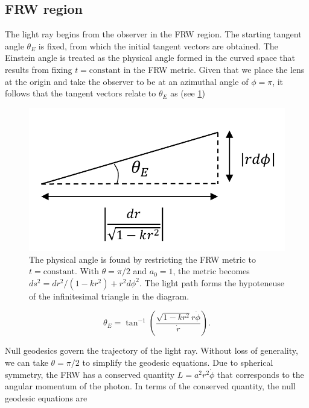 \subsection{FRW region}

The light ray begins from the observer in the FRW region. The starting tangent angle $\theta_E$ is fixed, from which the initial tangent vectors are obtained. The Einstein angle is treated as the physical angle formed in the curved space that results from fixing $t = \text{constant}$ in the FRW metric. Given that we place the lens at the origin and take the observer to be at an azimuthal angle of $\phi = \pi$, it follows that the tangent vectors relate to $\theta_E$ as (see \ref{fig:angle-to-tangent-vectors})

\begin{figure}
  \centering
  \includegraphics[height=0.2\linewidth]{images/angle.pdf}
  \caption{The physical angle is found by restricting the FRW metric to $t = \text{constant}$. With $\theta = \pi/2$ and $a_0 = 1$, the metric becomes $ds^2 = dr^2 / (1-kr^2) + r^2 d\phi^2$. The light path forms the hypoteneuse of the infinitesimal triangle in the diagram. }
  \label{fig:angle-to-tangent-vectors}
\end{figure}

\begin{equation}
  \theta_E = \tan^{-1}\left (\frac{\sqrt{1-kr^2}r\dot{\phi}}{\dot{r}}\right ).
  \label{eq:angle-to-tangent-vectors}
\end{equation}

Null geodesics govern the trajectory of the light ray. Without loss of generality, we can take $\theta = \pi/2$ to simplify the geodesic equations. Due to spherical symmetry, the FRW has a conserved quantity $L = a^2 r^2 \dot{\phi}$ that corresponds to the angular momentum of the photon. In terms of the conserved quantity, the null geodesic equations are

